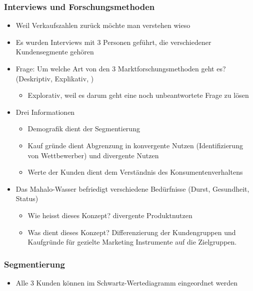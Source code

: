 \documentclass[a4paper]{article}
\begin{document}
\subsubsection{Interviews und Forschungsmethoden}
\begin{itemize}
    \item Weil Verkaufszahlen zurück möchte man verstehen wieso
    \item Es wurden Interviews mit 3 Personen geführt, die verschiedener Kundensegmente gehören
    \item Frage: Um welche Art von den 3 Marktforschungsmethoden geht es? (Deskriptiv, Explikativ, ) 
    \begin{itemize}
        \item Explorativ, weil es darum geht eine noch unbeantwortete Frage zu lösen
    \end{itemize} 
    \item Drei Informationen 
    \begin{itemize}
        \item Demografik dient der Segmentierung
        \item Kauf gründe dient Abgrenzung in konvergente Nutzen (Identifizierung von Wettbewerber) und divergente Nutzen
        \item Werte der Kunden dient dem Verständnis des Konsumentenverhaltens
    \end{itemize}
    \item Das Mahalo-Wasser befriedigt verschiedene Bedürfnisse (Durst, Gesundheit, Status)
    \begin{itemize}
        \item Wie heisst dieses Konzept? divergente Produktnutzen
        \item Was dient dieses Konzept? Differenzierung der Kundengruppen und Kaufgründe für gezielte Marketing Instrumente auf die Zielgruppen. 
    \end{itemize}

\end{itemize}

\subsubsection{Segmentierung}
\begin{itemize}
    \item Alle 3 Kunden können im Schwartz-Wertediagramm eingeordnet werden
\end{itemize}
\end{document}
